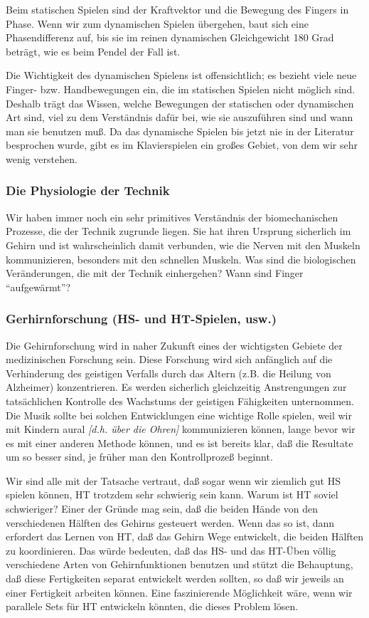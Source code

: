 Beim statischen Spielen sind der Kraftvektor und die Bewegung des Fingers in Phase.
Wenn wir zum dynamischen Spielen übergehen, baut sich eine Phasendifferenz auf, bis sie im reinen dynamischen Gleichgewicht 180 Grad beträgt, wie es beim Pendel der Fall ist.

Die Wichtigkeit des dynamischen Spielens ist offensichtlich; es bezieht viele neue Finger- bzw. Handbewegungen ein, die im statischen Spielen nicht möglich sind.
Deshalb trägt das Wissen, welche Bewegungen der statischen oder dynamischen Art sind, viel zu dem Verständnis dafür bei, wie sie auszuführen sind und wann man sie benutzen muß.
Da das dynamische Spielen bis jetzt nie in der Literatur besprochen wurde, gibt es im Klavierspielen ein großes Gebiet, von dem wir sehr wenig verstehen.


\subsubsection{Die Physiologie der Technik}
\label{c1iv6b}

Wir haben immer noch ein sehr primitives Verständnis der biomechanischen Prozesse, die der Technik zugrunde liegen.
Sie hat ihren Ursprung sicherlich im Gehirn und ist wahrscheinlich damit verbunden, wie die Nerven mit den Muskeln kommunizieren, besonders mit den schnellen Muskeln.
Was sind die biologischen Veränderungen, die mit der Technik einhergehen?
Wann sind Finger \enquote{aufgewärmt}?


\subsubsection{Gerhirnforschung (HS- und HT-Spielen, usw.)}
\label{c1iv6c}

Die Gehirnforschung wird in naher Zukunft eines der wichtigsten Gebiete der medizinischen Forschung sein.
Diese Forschung wird sich anfänglich auf die Verhinderung des geistigen Verfalls durch das Altern (z.B. die Heilung von Alzheimer) konzentrieren.
Es werden sicherlich gleichzeitig Anstrengungen zur tatsächlichen Kontrolle des Wachstums der geistigen Fähigkeiten unternommen.
Die Musik sollte bei solchen Entwicklungen eine wichtige Rolle spielen, weil wir mit Kindern aural \textit{[d.h. über die Ohren]} kommunizieren können, lange bevor wir es mit einer anderen Methode können, und es ist bereits klar, daß die Resultate um so besser sind, je früher man den Kontrollprozeß beginnt.

Wir sind alle mit der Tatsache vertraut, daß sogar wenn wir ziemlich gut HS spielen können, HT trotzdem sehr schwierig sein kann.
Warum ist HT soviel schwieriger?
Einer der Gründe mag sein, daß die beiden Hände von den verschiedenen Hälften des Gehirns gesteuert werden.
Wenn das so ist, dann erfordert das Lernen von HT, daß das Gehirn Wege entwickelt, die beiden Hälften zu koordinieren.
Das würde bedeuten, daß das HS- und das HT-Üben völlig verschiedene Arten von Gehirnfunktionen benutzen und stützt die Behauptung, daß diese Fertigkeiten separat entwickelt werden sollten, so daß wir jeweils an einer Fertigkeit arbeiten können.
Eine faszinierende Möglichkeit wäre, wenn wir parallele Sets für HT entwickeln könnten, die dieses Problem lösen.


